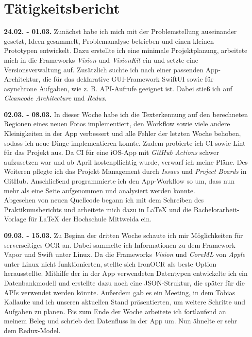 \documentclass[notables, nomenclature, oneside, 150]{HSMW-Thesis}
\begin{document}
\chapter{Tätigkeitsbericht}
	\textbf{24.02. - 01.03.}
	Zunächst habe ich mich mit der Problemstellung auseinander gesetzt, Ideen gesammelt, Problemanalyse betrieben und einen kleinen Prototypen entwickelt. Dazu erstellte ich eine minimale Projektplanung, arbeitete mich in die Frameworks \textit{Vision} und \textit{VisionKit} ein und setzte eine Versionsverwaltung auf. Zusätzlich suchte ich nach einer passenden App-Architektur, die für das deklarative GUI-Framework SwiftUI sowie für asynchrone Aufgaben, wie z. B. API-Aufrufe geeignet ist. Dabei stieß ich auf \textit{Cleancode Architecture} und \textit{Redux}.
	
	\textbf{02.03. - 08.03.} 
	In dieser Woche habe ich die Texterkennung auf den berechneten Regionen eines neuen Fotos implementiert, den Workflow sowie viele andere Kleinigkeiten in der App verbessert und alle Fehler der letzten Woche behoben, sodass ich neue Dinge implementieren konnte. Zudem probierte ich CI sowie Lint für das Projekt aus. Da CI für eine iOS-App mit \textit{GitHub Actions} schwer aufzusetzen war und ab April kostenpflichtig wurde, verwarf ich meine Pläne. Des Weiteren pflegte ich das Projekt Management durch \textit{Issues} und \textit{Project Boards} in GitHub. Anschließend programmierte ich den App-Workflow so um, dass nun mehr als eine Seite aufgenommen und analysiert werden konnte. \\ 			
	Abgesehen von neuen Quellcode begann ich mit dem Schreiben des Praktikumsberichts und arbeitete mich dazu in \LaTeX \xspace und die Bachelorarbeit-Vorlage für \LaTeX \xspace der Hochschule Mittweida ein.
	
	\textbf{09.03. - 15.03.} 
	Zu Beginn der dritten Woche schaute ich mir Möglichkeiten für serverseitiges OCR an. Dabei sammelte ich Informationen zu dem Framework Vapor und Swift unter Linux. Da die Frameworks \textit{Vision} und \textit{CoreML} von \textit{Apple} unter Linux nicht funktionierten, stellte sich IronOCR als beste Option herausstellte. Mithilfe der in der App verwendeten Datentypen entwickelte ich ein Datenbankmodell und erstellte dazu noch eine JSON-Struktur, die später für die APIs verwendet werden könnte. Außerdem gab es ein Meeting, in dem Tobias Kallauke und ich unseren aktuellen Stand präsentierten, um weitere Schritte und Aufgaben zu planen. Bis zum Ende der Woche arbeitete ich fortlaufend an meinem Beleg und schrieb den Datenfluss in der App um. Nun ähnelte er sehr dem Redux-Model.
	
\end{document}
